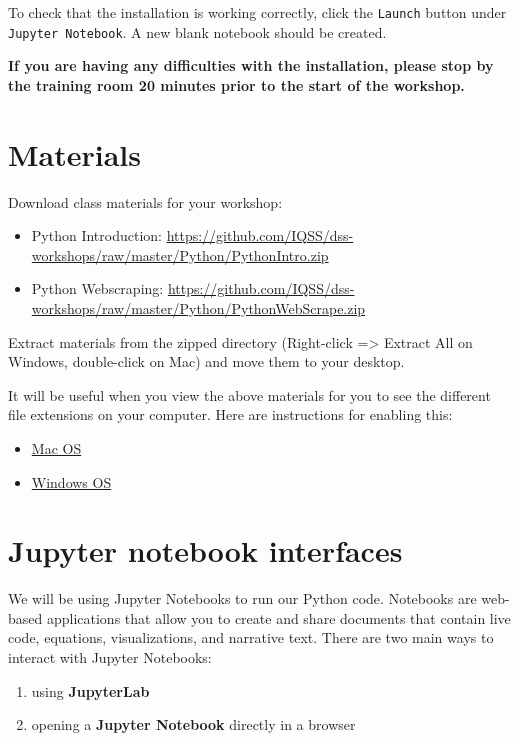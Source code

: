 \documentclass[]{book}
\providecommand{\tightlist}{%
  \setlength{\itemsep}{0pt}\setlength{\parskip}{0pt}}
\begin{document}
To check that the installation is working correctly, click the
\texttt{Launch} button under \texttt{Jupyter\ Notebook}. A new blank
notebook should be created.

\textbf{If you are having any difficulties with the installation, please
stop by the training room 20 minutes prior to the start of the
workshop.}

\section{Materials}\label{materials-1}

Download class materials for your workshop:

\begin{itemize}
\tightlist
\item
  Python Introduction:
  \url{https://github.com/IQSS/dss-workshops/raw/master/Python/PythonIntro.zip}
\item
  Python Webscraping:
  \url{https://github.com/IQSS/dss-workshops/raw/master/Python/PythonWebScrape.zip}
\end{itemize}

Extract materials from the zipped directory (Right-click =\textgreater{}
Extract All on Windows, double-click on Mac) and move them to your
desktop.

It will be useful when you view the above materials for you to see the
different file extensions on your computer. Here are instructions for
enabling this:

\begin{itemize}
\tightlist
\item
  \href{https://support.apple.com/guide/mac-help/show-or-hide-filename-extensions-on-mac-mchlp2304/mac}{Mac
  OS}
\item
  \href{http://kb.winzip.com/kb/entry/26/}{Windows OS}
\end{itemize}

\section{Jupyter notebook interfaces}\label{jupyter-notebook-interfaces}

We will be using Jupyter Notebooks to run our Python code. Notebooks are
web-based applications that allow you to create and share documents that
contain live code, equations, visualizations, and narrative text. There
are two main ways to interact with Jupyter Notebooks:

\begin{enumerate}
\def\labelenumi{\arabic{enumi}.}
\tightlist
\item
  using \textbf{JupyterLab}
\item
  opening a \textbf{Jupyter Notebook} directly in a browser
\end{enumerate}
\end{document}
